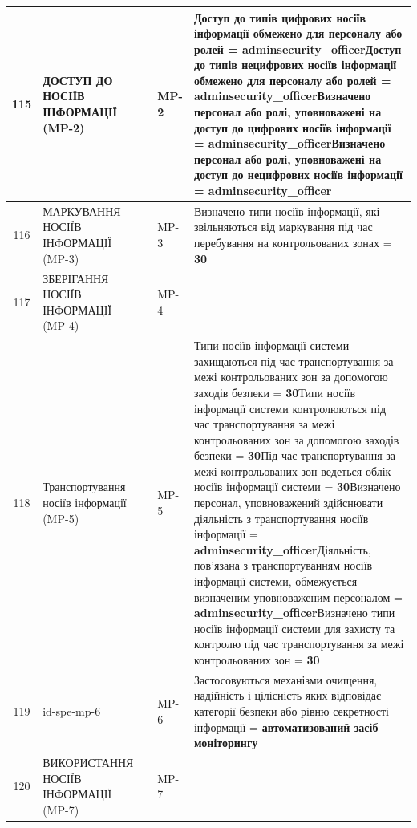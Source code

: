 \documentclass[10pt]{article}
\begin{document}
\begin{longtable}{|c|>{\raggedright\arraybackslash}p{4cm}|>{\raggedright\arraybackslash}p{2.5cm}|>{\raggedright\arraybackslash}p{3.5cm}|>{\raggedright\arraybackslash}p{5.5cm}|}
115 & ДОСТУП ДО НОСІЇВ ІНФОРМАЦІЇ (MP-2) &  & MP-2 & Доступ до типів цифрових носіїв інформації обмежено для персоналу або ролей = \textbf{adminsecurity\_\allowbreak{}officer}\newline Доступ до типів нецифрових носіїв інформації обмежено для персоналу або ролей = \textbf{adminsecurity\_\allowbreak{}officer}\newline Визначено персонал або ролі, уповноважені на доступ до цифрових носіїв інформації = \textbf{adminsecurity\_\allowbreak{}officer}\newline Визначено персонал або ролі, уповноважені на доступ до нецифрових носіїв інформації = \textbf{adminsecurity\_\allowbreak{}officer} \\ \hline
116 & МАРКУВАННЯ НОСІЇВ ІНФОРМАЦІЇ (MP-3) &  & MP-3 & Визначено типи носіїв інформації, які звільняються від маркування під час перебування на контрольованих зонах = \textbf{30} \\ \hline
117 & ЗБЕРІГАННЯ НОСІЇВ ІНФОРМАЦІЇ (MP-4) &  & MP-4 &  \\ \hline
118 & Транспортування носіїв інформації (MP-5) &  & MP-5 & Типи носіїв інформації системи захищаються під час транспортування за межі контрольованих зон за допомогою заходів безпеки = \textbf{30}\newline Типи носіїв інформації системи контролюються під час транспортування за межі контрольованих зон за допомогою заходів безпеки = \textbf{30}\newline Під час транспортування за межі контрольованих зон ведеться облік носіїв інформації системи = \textbf{30}\newline Визначено персонал, уповноважений здійснювати діяльність з транспортування носіїв інформації = \textbf{adminsecurity\_\allowbreak{}officer}\newline Діяльність, пов'язана з транспортуванням носіїв інформації системи, обмежується визначеним уповноваженим персоналом = \textbf{adminsecurity\_\allowbreak{}officer}\newline Визначено типи носіїв інформації системи для захисту та контролю під час транспортування за межі контрольованих зон = \textbf{30} \\ \hline
119 & id-spe-mp-6 &  & MP-6 & Застосовуються механізми очищення, надійність і цілісність яких відповідає категорії безпеки або рівню секретності інформації = \textbf{автоматизований засіб моніторингу} \\ \hline
120 & ВИКОРИСТАННЯ НОСІЇВ ІНФОРМАЦІЇ (MP-7) &  & MP-7 &  \\ \hline

\end{longtable}
\end{document}
